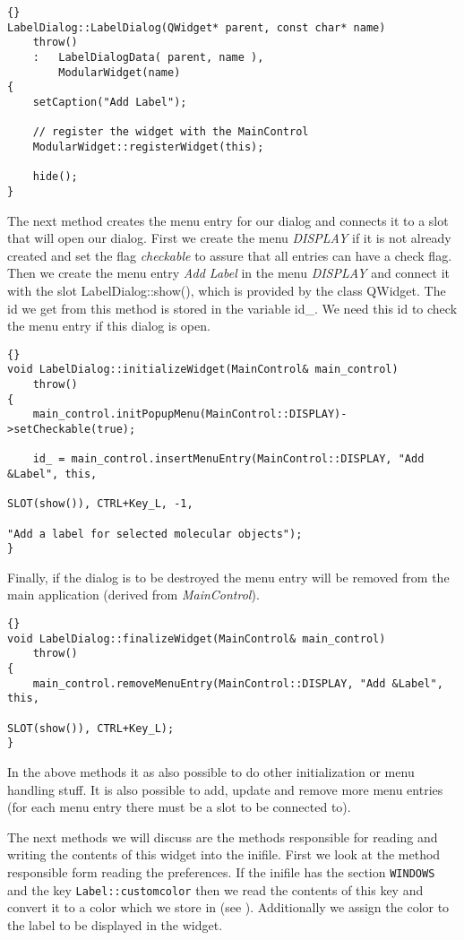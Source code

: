 \begin{lstlisting}{}
LabelDialog::LabelDialog(QWidget* parent, const char* name)
	throw()
	:	LabelDialogData( parent, name ),
		ModularWidget(name)
{
	setCaption("Add Label");

	// register the widget with the MainControl
	ModularWidget::registerWidget(this);

	hide();
}
\end{lstlisting}

The next method creates the menu entry for our dialog and connects it to a slot
that will open our dialog. First we create the menu {\em DISPLAY} if it is not
already created and set the flag {\em checkable} to assure that all entries
can have a check flag.
Then we create the menu entry {\em Add Label} in the menu {\em DISPLAY} and
connect it with the slot LabelDialog::show(), which is provided by the class QWidget. 
The id we get from this method is stored in the variable id\_. We need this
id to check the menu entry if this dialog is open.

\begin{lstlisting}{}
void LabelDialog::initializeWidget(MainControl& main_control)
	throw()
{
	main_control.initPopupMenu(MainControl::DISPLAY)->setCheckable(true);

	id_ = main_control.insertMenuEntry(MainControl::DISPLAY, "Add &Label", this,
																		 SLOT(show()), CTRL+Key_L, -1,
																		 "Add a label for selected molecular objects");   
}

\end{lstlisting}

Finally, if the dialog is to be destroyed the menu entry will be removed from
the main application (derived from {\em MainControl}).
\begin{lstlisting}{}
void LabelDialog::finalizeWidget(MainControl& main_control)
	throw()
{
	main_control.removeMenuEntry(MainControl::DISPLAY, "Add &Label", this,
															 SLOT(show()), CTRL+Key_L);   
}
\end{lstlisting}

In the above methods it as also possible to do other initialization or menu handling stuff.
It is also possible to add, update and remove more menu entries (for each menu entry
there must be a slot to be connected to).


The next methods we will discuss are the methods responsible for reading and
writing the contents of this widget into the inifile. First we look at the
method responsible form reading the preferences.
If the inifile has the section {\tt WINDOWS} and the key {\tt Label::customcolor} then
we read the contents of this key and convert it to a color which we store in
 (see ). 
Additionally we assign the color to the label to be displayed in the widget.

